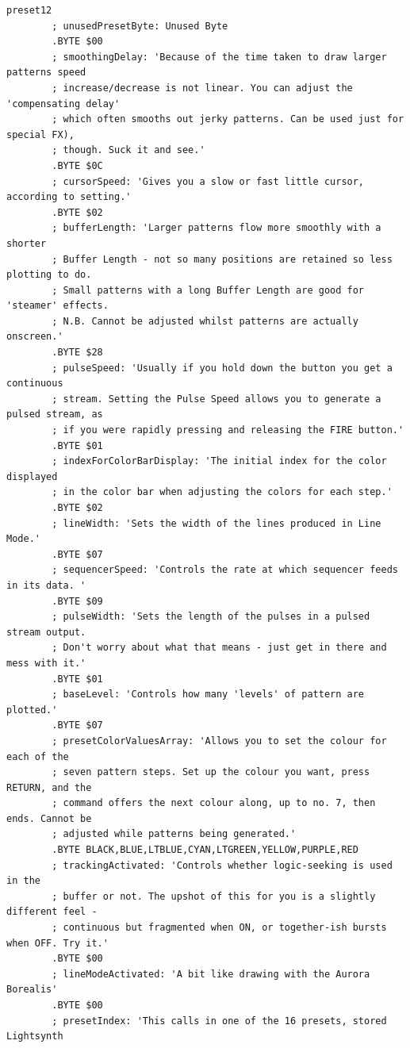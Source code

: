 \begin{lstlisting}[basicstyle=\ttfamily\tiny,caption=Source code for Preset 12.]
preset12
        ; unusedPresetByte: Unused Byte
        .BYTE $00
        ; smoothingDelay: 'Because of the time taken to draw larger patterns speed
        ; increase/decrease is not linear. You can adjust the 'compensating delay'
        ; which often smooths out jerky patterns. Can be used just for special FX),
        ; though. Suck it and see.'
        .BYTE $0C
        ; cursorSpeed: 'Gives you a slow or fast little cursor, according to setting.'
        .BYTE $02
        ; bufferLength: 'Larger patterns flow more smoothly with a shorter
        ; Buffer Length - not so many positions are retained so less plotting to do.
        ; Small patterns with a long Buffer Length are good for 'steamer' effects.
        ; N.B. Cannot be adjusted whilst patterns are actually onscreen.'
        .BYTE $28
        ; pulseSpeed: 'Usually if you hold down the button you get a continuous
        ; stream. Setting the Pulse Speed allows you to generate a pulsed stream, as
        ; if you were rapidly pressing and releasing the FIRE button.'
        .BYTE $01
        ; indexForColorBarDisplay: 'The initial index for the color displayed
        ; in the color bar when adjusting the colors for each step.'
        .BYTE $02
        ; lineWidth: 'Sets the width of the lines produced in Line Mode.'
        .BYTE $07
        ; sequencerSpeed: 'Controls the rate at which sequencer feeds in its data. '
        .BYTE $09
        ; pulseWidth: 'Sets the length of the pulses in a pulsed stream output.
        ; Don't worry about what that means - just get in there and mess with it.'
        .BYTE $01
        ; baseLevel: 'Controls how many 'levels' of pattern are plotted.'
        .BYTE $07
        ; presetColorValuesArray: 'Allows you to set the colour for each of the
        ; seven pattern steps. Set up the colour you want, press RETURN, and the
        ; command offers the next colour along, up to no. 7, then ends. Cannot be
        ; adjusted while patterns being generated.'
        .BYTE BLACK,BLUE,LTBLUE,CYAN,LTGREEN,YELLOW,PURPLE,RED
        ; trackingActivated: 'Controls whether logic-seeking is used in the
        ; buffer or not. The upshot of this for you is a slightly different feel -
        ; continuous but fragmented when ON, or together-ish bursts when OFF. Try it.'
        .BYTE $00
        ; lineModeActivated: 'A bit like drawing with the Aurora Borealis'
        .BYTE $00
        ; presetIndex: 'This calls in one of the 16 presets, stored Lightsynth

\end{lstlisting}

